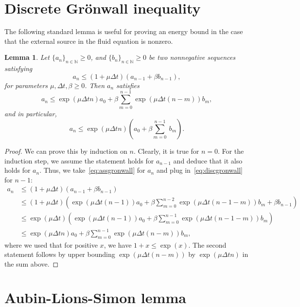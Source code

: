 \documentclass[10pt,letterpaper]{amsart}
\newcommand{\N}{\mathbb{N}}
\newtheorem{lemma}{Lemma}[section]
\theoremstyle{definition}{\newtheorem{definition}[lemma]{Definition}}
\numberwithin{equation}{section}
\begin{document}
\section{Discrete Gr\"onwall inequality}
The following standard lemma is useful for proving an energy bound in the case that the external source in the fluid equation is nonzero.
\begin{lemma}
	\label{lem:discretegronwall}
	Let $\{a_n\}_{n\in \N}\geq 0$, and $\{b_n\}_{n\in \N}\geq 0$ be two nonnegative sequences satisfying
	\begin{equation}\label{eq:assgronwall}
		a_n \leq (1+\mu \Delta t)(a_{n-1} +\beta b_{n-1}),
	\end{equation}
	for parameters $\mu,\Delta t, \beta\geq 0$.
	Then $a_n$ satisfies
	\begin{equation}\label{eq:discgronwall}
		a_n \leq \exp(\mu \Delta t n)a_0 +\beta \sum_{m=0}^{n-1}\exp(\mu\Delta t (n-m))b_m,
	\end{equation}
	and in particular,
	\begin{equation*}
		a_n \leq \exp(\mu \Delta t n)\left(a_0+\beta \sum_{m=0}^{n-1}\ b_m \right).
	\end{equation*}
\end{lemma}
\begin{proof}
	We can prove this by induction on $n$. Clearly, it is true for $n=0$. For the induction step, we assume the statement holds for $a_{n-1}$ and deduce that it also holds for $a_n$. Thus, we take~\eqref{eq:assgronwall} for $a_n$ and plug in~\eqref{eq:discgronwall} for $n-1$:
	\begin{align*}
		a_n & \leq (1+\mu \Delta t)(a_{n-1} +\beta b_{n-1})\\
		& \leq (1+\mu \Delta t)\left(\exp(\mu \Delta t (n-1))a_0 +\beta \sum_{m=0}^{n-2}\exp(\mu\Delta t (n-1-m))b_m+\beta b_{n-1}\right)\\
		& \leq \exp(\mu\Delta t )\left(\exp(\mu \Delta t (n-1))a_0 +\beta \sum_{m=0}^{n-1}\exp(\mu\Delta t (n-1-m))b_m\right)\\
		& \leq\exp(\mu \Delta t n)a_0 +\beta \sum_{m=0}^{n-1}\exp(\mu\Delta t (n-m))b_m,
	\end{align*} 
	where we used that for positive $x$, we have $1+x\leq \exp(x)$. The second statement follows by upper bounding $\exp(\mu\Delta t(n-m))$ by $\exp(\mu\Delta t n)$ in the sum above.
\end{proof}


\section{Aubin-Lions-Simon lemma}
\label{app:ALSlemma}
\end{document}
